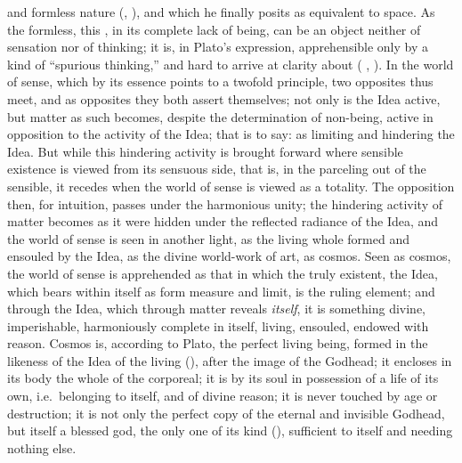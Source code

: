 and formless nature (, ), and which he finally posits as equivalent to
space. As the formless, this , in its complete lack of being, can be an object
neither of sensation nor of thinking; it is, in Plato's expression, apprehensible only by
a kind of ``spurious thinking,'' and hard to arrive at clarity about
(
, ).
In the world of sense, which by its essence points to a twofold principle, two
opposites thus meet, and as opposites they both assert themselves; not only is the Idea
active, but matter as such becomes, despite the determination of non-being, active in
opposition to the activity of the Idea; that is to say: as limiting and hindering the Idea.
But while this hindering activity is brought forward where sensible existence is viewed
from its sensuous side, that is, in the parceling out of the sensible, it recedes when the
world of sense is viewed as a totality. The opposition then, for intuition, passes under
the harmonious unity; the hindering activity of matter becomes as it were hidden under the
reflected radiance of the Idea, and the world of sense is seen in another light, as the
living whole formed and ensouled by the Idea, as the divine world-work of art, as cosmos.
Seen as cosmos, the world of sense is apprehended as that in which the truly existent, the
Idea, which bears within itself as form measure and limit, is the ruling element; and
through the Idea, which through matter reveals \emph{itself}, it is something divine,
imperishable, harmoniously complete in itself, living, ensouled, endowed with reason.
Cosmos is, according to Plato, the perfect living being, formed in the likeness of the
Idea of the living (), after the image of the Godhead; it encloses in its body
the whole of the corporeal; it is by its soul in possession of a life of its own, i.e.\
belonging to itself, and of divine reason; it is never touched by age or destruction; it
is not only the perfect copy of the eternal and invisible Godhead, but itself a blessed
god, the only one of its kind (\gk{μονογενὴς}), sufficient to itself and needing nothing
else.

